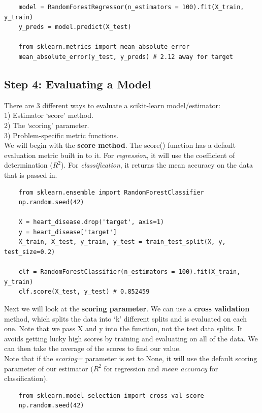 \documentclass[11pt, a4paper]{article}
\begin{document}
\begin{spacing}{1.1}
\begin{lstlisting}
	model = RandomForestRegressor(n_estimators = 100).fit(X_train, y_train)
	y_preds = model.predict(X_test)
	
	from sklearn.metrics import mean_absolute_error
	mean_absolute_error(y_test, y_preds) # 2.12 away for target \end{lstlisting} \vspace*{1mm}
	
	\subsection{Step 4: Evaluating a Model}
	There are 3 different ways to evaluate a scikit-learn model/estimator: \\
	\hspace*{2mm} 1) Estimator `score' method. \\
	\hspace*{2mm} 2) The `scoring' parameter. \\
	\hspace*{2mm} 3) Problem-specific metric functions. \vspace*{2mm} \\
	We will begin with the \textbf{score method}. The score() function has a default evaluation metric built in to it. For \textit{regression}, it will use the coefficient of determination ($R^2$). For \textit{classification}, it returns the mean accuracy on the data that is passed in. \newpage

	\begin{lstlisting}
	from sklearn.ensemble import RandomForestClassifier
	np.random.seed(42)
	
	X = heart_disease.drop('target', axis=1)
	y = heart_disease['target']
	X_train, X_test, y_train, y_test = train_test_split(X, y, test_size=0.2)
	
	clf = RandomForestClassifier(n_estimators = 100).fit(X_train, y_train)
	clf.score(X_test, y_test) # 0.852459
	\end{lstlisting} \vspace*{1mm}
	Next we will look at the \textbf{scoring parameter}. We can use a \textbf{cross validation} method, which splits the data into `k' different splits and is evaluated on each one. Note that we pass X and y into the function, not the test data splits. It avoids getting lucky high scores by training and evaluating on all of the data. We can then take the average of the scores to find our value. \vspace*{1mm} \\
	Note that if the \textit{scoring=} parameter is set to None, it will use the default scoring parameter of our estimator ($R^2$ for regression and \textit{mean accuracy} for classification). 
	\begin{lstlisting}
	from sklearn.model_selection import cross_val_score
	np.random.seed(42)
	

\end{lstlisting}
\end{spacing}
\end{document}
